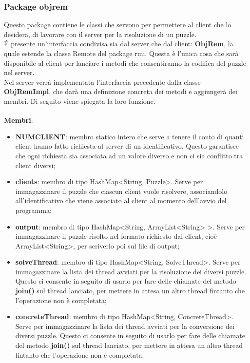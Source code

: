 		\subsubsection{Package objrem} %
		\label{ssub:package_objrem}
		Questo package contiene le classi che servono per permettere al client che lo desidera, di lavorare con il server per la risoluzione di un puzzle. \\
		\'E presente un'interfaccia condivisa sia dal server che dal client: \textbf{ObjRem}, la quale estende la classe Remote del package rmi. Questa è l'unica cosa che sarà disponibile al client per lanciare i metodi che consentiranno la codifica del puzzle nel server. \\
		Nel server verrà implementata l'interfaccia precedente dalla classe \textbf{ObjRemImpl}, che darà una definizione concreta dei metodi e aggiungerà dei membri. Di seguito viene spiegata la loro funzione. \\ \\
		\textbf{Membri}:
			\begin{itemize}
				\item \textbf{NUMCLIENT}: membro statico intero che serve a tenere il conto di quanti client hanno fatto richiesta al server di un identificativo. Questo garantisce che ogni richiesta sia associata ad un valore diverso e non ci sia conflitto tra client diversi;
				\item \textbf{clients}: membro di tipo HashMap<String, Puzzle>. Serve per immagazzinare il puzzle che ciascun client vuole risolvere, associandolo all'identificativo che viene associato al client al momento dell'avvio del programma;
				\item \textbf{output}: membro di tipo HashMap<String, ArrayList<String> >. Serve per immagazzinare il puzzle risolto nel formato richiesto dal client, cioè ArrayList<String>, per scriverlo poi sul file di output;
				\item \textbf{solveThread}: membro di tipo HashMap<String, SolveThread>. Serve per immagazzinare la lista dei thread avviati per la risoluzione dei diversi puzzle. Questo ci consente in seguito di usarlo per fare delle chiamate del metodo \textbf{join()} sul thread lanciato, per mettere in attesa un altro thread fintanto che l'operazione non è completata;
				\item \textbf{concreteThread}: membro di tipo HashMap<String, ConcreteThread>. Serve per immagazzinare la lista dei thread avviati per la conversione dei diversi puzzle. Questo ci consente in seguito di usarlo per fare delle chiamate del metodo \textbf{join()} sul thread lanciato, per mettere in attesa un altro thread fintanto che l'operazione non è completata.
			\end{itemize}
